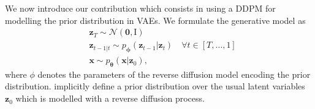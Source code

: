 We now introduce our contribution which consists in using a DDPM for modelling the prior distribution in VAEs.
We formulate the generative model as
\begin{align}
    & \mathbf{z}_T \sim \mathcal{N}(\mathbf{0}, \text{I}) \label{eq:VAE_DDPM_1} \\
    & \mathbf{z}_{t-1|t} \sim p_\mathbf{\phi}(\mathbf{z}_{t-1}|\mathbf{z}_{t})\quad \forall t \in \left[T, \dots, 1\right] \label{eq:VAE_DDPM_2} \\
    &\mathbf{x} \sim p_\mathbf{\theta}(\mathbf{x}|\mathbf{z}_0),
\end{align}
where $\phi$ denotes the parameters of the reverse diffusion model encoding the prior distribution.  implicitly define a prior distribution over the usual latent variables $\mathbf{z}_0$ which is modelled with a reverse diffusion process.


